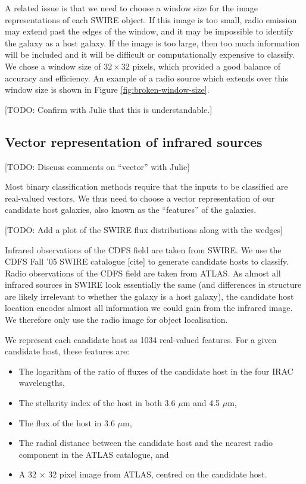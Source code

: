 \documentclass[fleqn,usenatbib,usedcolumn]{mnras}
\begin{document}
    A related issue is that we need to choose a window size for the image
    representations of each SWIRE object. If this image is too small, radio
    emission may extend past the edges of the window, and it may be impossible
    to identify the galaxy as a host galaxy. If the image is too large, then
    too much information will be included and it will be difficult or
    computationally expensive to classify. We chose a window size of $32
    \times 32$ pixels, which provided a good balance of accuracy and
    efficiency. An example of a radio source which extends over this window
    size is shown in Figure \ref{fig:broken-window-size}.

    [TODO: Confirm with Julie that this is understandable.]

  \subsection{Vector representation of infrared
  sources}\label{vector-representation-of-infrared-sources}

    {[}TODO: Discuss comments on ``vector'' with Julie{]}

    Most binary classification methods require that the inputs to be
    classified are real-valued vectors. We thus need to choose a vector
    representation of our candidate host galaxies, also known as the
    ``features'' of the galaxies.

    {[}TODO: Add a plot of the SWIRE flux distributions along with the
    wedges{]}

    Infrared observations of the CDFS field are taken from SWIRE. We use the
    CDFS Fall '05 SWIRE catalogue {[}cite{]} to generate candidate hosts to
    classify. Radio observations of the CDFS field are taken from ATLAS. As
    almost all infrared sources in SWIRE look essentially the same (and
    differences in structure are likely irrelevant to whether the galaxy is
    a host galaxy), the candidate host location encodes almost all
    information we could gain from the infrared image. We therefore only use
    the radio image for object localisation.

    We represent each candidate host as 1034 real-valued features. For a given
    candidate host, these features are:
    \begin{itemize}
      \item The logarithm of the ratio of fluxes of the candidate host in the
        four IRAC wavelengths,
      \item The stellarity index of the host in both 3.6 $\mu$m and 4.5
        $\mu$m,
      \item The flux of the host in 3.6 $\mu$m,
      \item The radial distance between the candidate host and the nearest
        radio component in the ATLAS catalogue, and
      \item A 32 $\times$ 32 pixel image from ATLAS, centred on the candidate
        host.
    \end{itemize}
\end{document}
